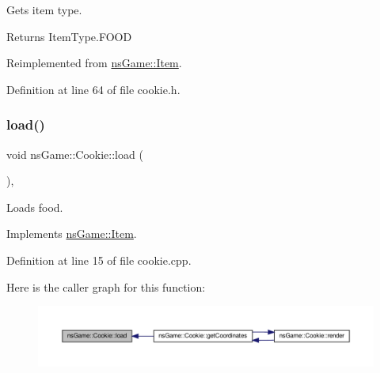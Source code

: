 Gets item type. 

\begin{DoxyReturn}{Returns}
Item\+Type.\+F\+O\+OD 
\end{DoxyReturn}


Reimplemented from \hyperlink{structns_game_1_1_item_a69156550e5083928cbb673ca2db671f5}{ns\+Game\+::\+Item}.



Definition at line 64 of file cookie.\+h.

\mbox{\label{classns_game_1_1_cookie_a20769adf2b327f4bf519e851073b1891}} 
\subsubsection{\texorpdfstring{load()}{load()}}
{\footnotesize\ttfamily void ns\+Game\+::\+Cookie\+::load (\begin{DoxyParamCaption}{ }\end{DoxyParamCaption})\hspace{0.3cm}{\ttfamily [override]}, {\ttfamily [virtual]}}



Loads food. 



Implements \hyperlink{structns_game_1_1_item_a5887b6e9225ae8a276801225eca83808}{ns\+Game\+::\+Item}.



Definition at line 15 of file cookie.\+cpp.

Here is the caller graph for this function\+:\nopagebreak
\begin{figure}[H]
\begin{center}
\leavevmode
\includegraphics[width=350pt]{classns_game_1_1_cookie_a20769adf2b327f4bf519e851073b1891_icgraph}
\end{center}
\end{figure}
\mbox{\label{classns_game_1_1_cookie_a7e321497bf9d9baa738d987e9c47dd5e}} 
